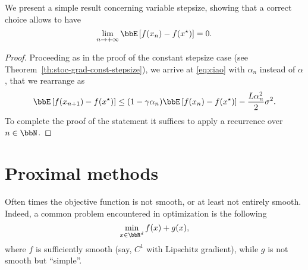      We present a simple result concerning variable stepsize, showing that a correct choice allows to have
     \begin{equation}
         \lim_{n\to +\infty} \bbE\left[ f(x_n)-f(x^\star) \right] = 0.
     \end{equation}
 
 
     \begin{proof}
         Proceeding as in the proof of the constant stepsize case (see Theorem~\ref{th:stoc-grad-const-stepsize}), we arrive at \eqref{eq:ciao} with $\alpha_n$ instead of $\alpha$, that we rearrange as
         \begin{equation}
             \bbE\left[ f(x_{n+1}) -f(x^\star)\right] \le (1-\gamma\alpha_n)  \bbE\left[f(x_{n}) -f(x^\star)\right]	-\frac{L\alpha_n^2}{2} \sigma^2 .
         \end{equation}
         To complete the proof of the statement it suffices to apply a recurrence over $n\in\bbN$.
     \end{proof}
 
     \section{Proximal methods}
 
     Often times the objective function is not smooth, or at least not entirely smooth.
     Indeed, a common problem encountered in optimization is the following
     \begin{equation}
         \label{eq:f+g-prox}
         \min_{x\in\bbR^d} f(x) + g(x),
     \end{equation}
     where $f$ is sufficiently smooth (say, $C^1$ with Lipschitz gradient), while $g$ is not smooth but ``simple''.
 
